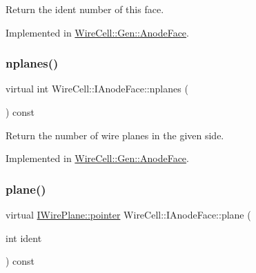 Return the ident number of this face. 



Implemented in \hyperlink{class_wire_cell_1_1_gen_1_1_anode_face_a57abc0570f11b050da061e694507b17d}{Wire\+Cell\+::\+Gen\+::\+Anode\+Face}.

\mbox{\label{class_wire_cell_1_1_i_anode_face_a5423e72fe99935c08c3076bda3a7354f}} 
\subsubsection{\texorpdfstring{nplanes()}{nplanes()}}
{\footnotesize\ttfamily virtual int Wire\+Cell\+::\+I\+Anode\+Face\+::nplanes (\begin{DoxyParamCaption}{ }\end{DoxyParamCaption}) const\hspace{0.3cm}{\ttfamily [pure virtual]}}



Return the number of wire planes in the given side. 



Implemented in \hyperlink{class_wire_cell_1_1_gen_1_1_anode_face_aa4becde47c5ca6e98a08674a61b33b72}{Wire\+Cell\+::\+Gen\+::\+Anode\+Face}.

\mbox{\label{class_wire_cell_1_1_i_anode_face_a79559335fb83389b656504e480eb2eb7}} 
\subsubsection{\texorpdfstring{plane()}{plane()}}
{\footnotesize\ttfamily virtual \hyperlink{class_wire_cell_1_1_interface_a09c548fb8266cfa39afb2e74a4615c37}{I\+Wire\+Plane\+::pointer} Wire\+Cell\+::\+I\+Anode\+Face\+::plane (\begin{DoxyParamCaption}\item[{int}]{ident }\end{DoxyParamCaption}) const\hspace{0.3cm}{\ttfamily [pure virtual]}}



